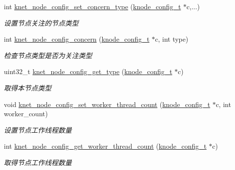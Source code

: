 \begin{DoxyCompactItemize}
int \hyperlink{a00104_ac0321d2cf804979fe145d2443f959dfb_ac0321d2cf804979fe145d2443f959dfb}{knet\+\_\+node\+\_\+config\+\_\+set\+\_\+concern\+\_\+type} (\hyperlink{a00066_af1cfaee0eb1c76ebf06076b95cc47ee1_af1cfaee0eb1c76ebf06076b95cc47ee1}{knode\+\_\+config\+\_\+t} $\ast$c,...)
\begin{DoxyCompactList}\small\item\em 设置节点关注的节点类型 \end{DoxyCompactList}\item 
int \hyperlink{a00104_a255581334b8d1d5a530374c4e979d941_a255581334b8d1d5a530374c4e979d941}{knet\+\_\+node\+\_\+config\+\_\+concern} (\hyperlink{a00066_af1cfaee0eb1c76ebf06076b95cc47ee1_af1cfaee0eb1c76ebf06076b95cc47ee1}{knode\+\_\+config\+\_\+t} $\ast$c, int type)
\begin{DoxyCompactList}\small\item\em 检查节点类型是否为关注类型 \end{DoxyCompactList}\item 
uint32\+\_\+t \hyperlink{a00104_a17812fb0dfbb4126997925751ce10840_a17812fb0dfbb4126997925751ce10840}{knet\+\_\+node\+\_\+config\+\_\+get\+\_\+type} (\hyperlink{a00066_af1cfaee0eb1c76ebf06076b95cc47ee1_af1cfaee0eb1c76ebf06076b95cc47ee1}{knode\+\_\+config\+\_\+t} $\ast$c)
\begin{DoxyCompactList}\small\item\em 取得本节点类型 \end{DoxyCompactList}\item 
void \hyperlink{a00104_a641862e4aa65a1f75e90b4b7385edf87_a641862e4aa65a1f75e90b4b7385edf87}{knet\+\_\+node\+\_\+config\+\_\+set\+\_\+worker\+\_\+thread\+\_\+count} (\hyperlink{a00066_af1cfaee0eb1c76ebf06076b95cc47ee1_af1cfaee0eb1c76ebf06076b95cc47ee1}{knode\+\_\+config\+\_\+t} $\ast$c, int worker\+\_\+count)
\begin{DoxyCompactList}\small\item\em 设置节点工作线程数量 \end{DoxyCompactList}\item 
int \hyperlink{a00104_a5f9dfba4c949d8f973f9561a6c271916_a5f9dfba4c949d8f973f9561a6c271916}{knet\+\_\+node\+\_\+config\+\_\+get\+\_\+worker\+\_\+thread\+\_\+count} (\hyperlink{a00066_af1cfaee0eb1c76ebf06076b95cc47ee1_af1cfaee0eb1c76ebf06076b95cc47ee1}{knode\+\_\+config\+\_\+t} $\ast$c)
\begin{DoxyCompactList}\small\item\em 取得节点工作线程数量 \end{DoxyCompactList}\item 

\end{DoxyCompactItemize}
